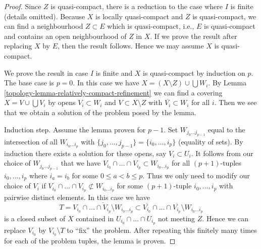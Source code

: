 \begin{proof}

Since $Z$ is quasi-compact, there is a reduction to the
case where $I$ is finite (details omitted).
Because $X$ is locally quasi-compact and $Z$ is quasi-compact,
we can find a neighbourhood $Z \subset E$ which is quasi-compact,
i.e., $E$ is quasi-compact and contains an open neighbourhood
of $Z$ in $X$. If we prove the result after replacing $X$ by $E$,
then the result follows. Hence we may assume $X$ is quasi-compact.

\medskip\noindent
We prove the result in case $I$ is finite and $X$ is quasi-compact
by induction on $p$. The base case is $p = 0$. In this case we have
$X = (X \setminus Z) \cup \bigcup W_i$. By
Lemma \ref{topology-lemma-relatively-compact-refinement}
we can find a covering $X = V \cup \bigcup V_i$ by
opens $V_i \subset W_i$ and $V \subset X \setminus Z$
with $\overline{V_i} \subset W_i$ for all $i$. Then we see that
we obtain a solution of the problem posed by the lemma.

\medskip\noindent
Induction step. Assume the lemma proven for $p - 1$.
Set $W_{j_0 \ldots j_{p - 1}}$ equal to the intersection of
all $W_{i_0 \ldots i_p}$ with
$\{j_0, \ldots, j_{p - 1}\} = \{i_0, \ldots, i_p\}$ (equality of sets).
By induction there exists a solution for these opens, say
$V_i \subset U_i$.
It follows from our choice of $W_{j_0 \ldots j_{p - 1}}$ that we have
$V_{i_0} \cap \ldots \cap V_{i_p} \subset W_{i_0 \ldots i_p}$
for all $(p + 1)$-tuples $i_0, \ldots, i_p$ where $i_a = i_b$ for
some $0 \leq a < b \leq p$.
Thus we only need to modify our choice of
$V_i$ if $V_{i_0} \cap \ldots \cap V_{i_p} \not \subset W_{i_0 \ldots i_p}$
for some $(p + 1)$-tuple $i_0, \ldots, i_p$ with pairwise distinct elements.
In this case we have
$$
T =
\overline{V_{i_0} \cap \ldots \cap V_{i_p} \setminus W_{i_0 \ldots i_p}}
\subset
\overline{V_{i_0}} \cap \ldots \cap \overline{V_{i_p}} \setminus
W_{i_0 \ldots i_p}
$$
is a closed subset of $X$ contained in $U_{i_0} \cap \ldots \cap U_{i_p}$
not meeting $Z$. Hence we can replace $V_{i_0}$ by $V_{i_0} \setminus T$
to ``fix'' the problem. After repeating this finitely many times for each
of the problem tuples, the lemma is proven.
\end{proof}

